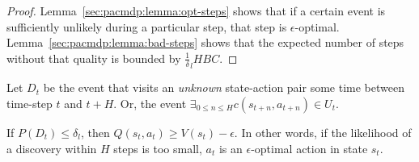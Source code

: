 \begin{proof}
Lemma~\ref{sec:pacmdp:lemma:opt-steps} shows that if a certain event is sufficiently unlikely during a particular step, that step is $\epsilon$-optimal. Lemma~\ref{sec:pacmdp:lemma:bad-steps} shows that the expected number of steps without that quality is bounded by $\frac 1 \delta_l H B C$.
\end{proof}

\begin{defn}
Let $D_t$ be the event that \A visits an \emph{unknown} state-action pair some time between time-step $t$ and $t+H$. Or, the event $\exists_{0\leq n\leq H} c(s_{t+n},a_{t+n}) \in U_t$.
\end{defn}

\begin{lemma}
\label{sec:pacmdp:lemma:opt-steps}
If $P(D_t) \leq \delta_l$, then $Q(s_t,a_t) \geq V(s_t) - \epsilon$. In other words, if the likelihood of a discovery within $H$ steps is too small, $a_t$ is an $\epsilon$-optimal action in state $s_t$.
\end{lemma}

